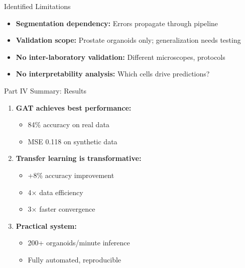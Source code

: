 \documentclass[aspectratio=169]{beamer}
\begin{document}
\begin{frame}{Identified Limitations}
    \begin{itemize}
        \item \textbf{Segmentation dependency:} Errors propagate through pipeline
        
        \vspace{0.5em}
        \item \textbf{Validation scope:} Prostate organoids only; generalization needs testing
        
        \vspace{0.5em}
        \item \textbf{No inter-laboratory validation:} Different microscopes, protocols
        
        \vspace{0.5em}
        \item \textbf{No interpretability analysis:} Which cells drive predictions?
        \end{itemize}
\end{frame}

\begin{frame}{Part IV Summary: Results}
    \begin{enumerate}
        \item \textbf{GAT achieves best performance:}
    \begin{itemize}
            \item 84\% accuracy on real data
            \item MSE 0.118 on synthetic data
        \end{itemize}
        
        \vspace{0.5em}
        \item \textbf{Transfer learning is transformative:}
        \begin{itemize}
            \item +8\% accuracy improvement
            \item 4× data efficiency
            \item 3× faster convergence
        \end{itemize}
        
        \vspace{0.5em}
        \item \textbf{Practical system:}
        \begin{itemize}
            \item 200+ organoids/minute inference
            \item Fully automated, reproducible
        \end{itemize}
    \end{enumerate}
\end{frame}
\end{document}
